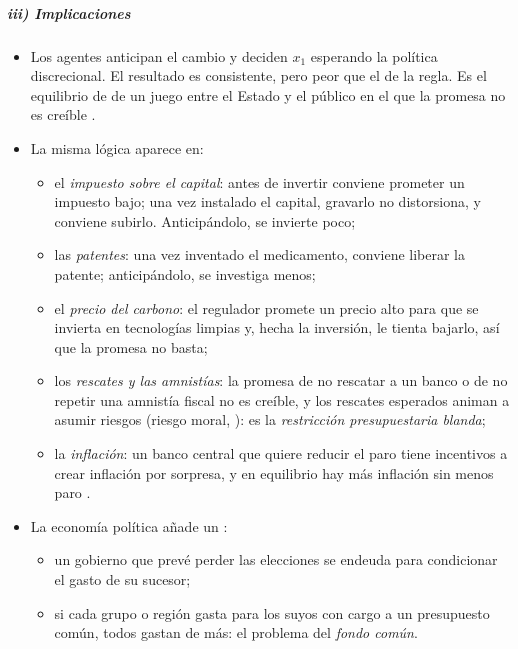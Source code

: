 \documentclass[11pt]{article}
\begin{document}
\subparagraph{iii) Implicaciones}
\begin{itemize}
\item Los agentes anticipan el cambio y deciden $x_1$ esperando la política discrecional. El resultado es consistente, pero peor que el de la regla. Es el equilibrio de  de un juego entre el Estado y el público en el que la promesa no es creíble .
\item La misma lógica aparece en:
  \begin{itemize}
  \item el \emph{impuesto sobre el capital}: antes de invertir conviene prometer un impuesto bajo; una vez instalado el capital, gravarlo no distorsiona, y conviene subirlo. Anticipándolo, se invierte poco\nocite{Fischer1980Dynamic};
  \item las \emph{patentes}: una vez inventado el medicamento, conviene liberar la patente; anticipándolo, se investiga menos\nocite{KydlandPrescott1977Rules};
  \item el \emph{precio del carbono}: el regulador promete un precio alto para que se invierta en tecnologías limpias y, hecha la inversión, le tienta bajarlo, así que la promesa no basta\nocite{HelmHepburnMash2003Credible};
  \item los \emph{rescates y las amnistías}: la promesa de no rescatar a un banco o de no repetir una amnistía fiscal no es creíble, y los rescates esperados animan a asumir riesgos (riesgo moral, ): es la \emph{restricción presupuestaria blanda}\nocite{Kornai1986Soft};
  \item la \emph{inflación}: un banco central que quiere reducir el paro tiene incentivos a crear inflación por sorpresa, y en equilibrio hay más inflación sin menos paro\nocite{BarroGordon1983Positive} .
  \end{itemize}
\item La economía política añade un  :
  \begin{itemize}
  \item un gobierno que prevé perder las elecciones se endeuda para condicionar el gasto de su sucesor\nocite{PerssonSvensson1989Why,AlesinaTabellini1990Positive};
  \item si cada grupo o región gasta para los suyos con cargo a un presupuesto común, todos gastan de más: el problema del \emph{fondo común}\nocite{WeingastShepsleJohnsen1981Political}.
  \end{itemize}
\end{itemize}
\end{document}
